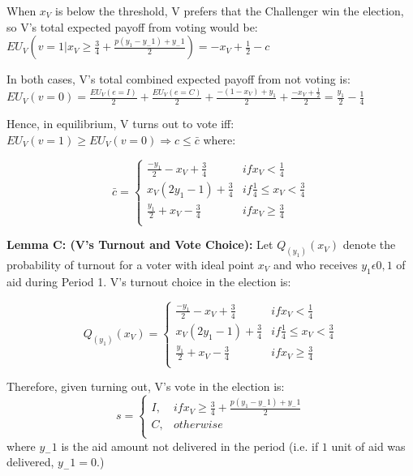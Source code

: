 \documentclass[12pt]{paper}
\begin{document}
When $x_V$ is below the threshold, V prefers that the Challenger win the election, so V’s total expected payoff from voting would be:
$ EU_V (v=1 | x_V \geq \frac{3}{4} + \frac{p(y_1 - y_-1 ) + y_-1}{2}) = -x_V + \frac{1}{2} - c$

In both cases, V’s total combined expected payoff from not voting is:
$ EU_V (v=0) = \frac{EU_V (e=I)}{2} + \frac{EU_V (e=C)}{2} + \frac{- (1 - x_V ) + y_1}{2} + \frac{-x_V + \frac{1}{2}}{2} = \frac{y_1}{2} - \frac{1}{4}$

Hence, in equilibrium, V turns out to vote iff: $EU_V (v=1) \geq EU_V (v=0) \Rightarrow c \leq \bar{c}$ where:

\begin{equation}
\bar{c} =
\begin{cases}
\frac{-y_1}{2} - x_V + \frac{3}{4} & if x_V < \frac{1}{4}\\    
x_V (2y_1 - 1) + \frac{3}{4}     & if \frac{1}{4} \leq x_V < \frac{3}{4}  \\
\frac{y_1}{2} + x_V - \frac{3}{4}     & if x_V \geq \frac{3}{4}  \\
\end{cases}
\end{equation}

\textbf{Lemma C: (V’s Turnout and Vote Choice):} Let $Q_(y_1 )(x_V )$ denote the probability of turnout for a voter with ideal point $x_V$ and who receives $y_1 \epsilon {0,1}$ of aid during Period 1. V’s turnout choice in the election is:

\begin{equation}
Q_(y_1 )(x_V ) =
\begin{cases}
\frac{-y_1}{2} - x_V + \frac{3}{4} & if x_V < \frac{1}{4}\\    
x_V (2y_1 - 1) + \frac{3}{4}     & if \frac{1}{4} \leq x_V < \frac{3}{4}  \\
\frac{y_1}{2} + x_V - \frac{3}{4}     & if x_V \geq \frac{3}{4}  \\
\end{cases}
\end{equation}

Therefore, given turning out, V’s vote in the election is:
\begin{equation}
s =
\begin{cases}
I, & if x_V \geq \frac{3}{4} + \frac{p(y_1 - y_-1) + y_-1}{2} \\    
C,     & otherwise  \\
\end{cases}
\end{equation}
where $y_-1$ is the aid amount not delivered in the period (i.e. if $1$ unit of aid was delivered, $y_-1 = 0$.)
\end{document}
